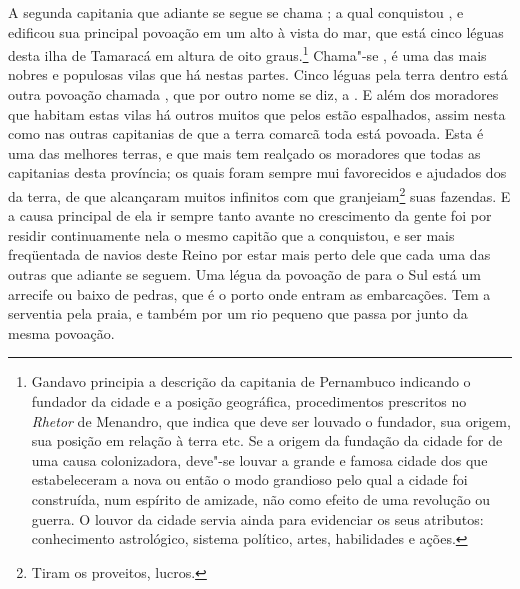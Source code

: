 A segunda capitania que adiante se segue se chama ; a qual
conquistou , e edificou sua principal povoação em um alto
à vista do mar, que está cinco léguas desta ilha de Tamaracá em
altura de oito graus.\footnote{ Gandavo principia a descrição da
capitania de Pernambuco indicando o fundador da cidade e a posição
geográfica, procedimentos prescritos no \textit{Rhetor} de Menandro,
que indica que deve ser louvado o fundador, sua origem, sua posição em
relação à terra etc. Se a origem da fundação da cidade for de uma
causa colonizadora, deve"-se louvar a grande e famosa cidade dos que
estabeleceram a nova ou então o modo grandioso pelo qual a cidade foi
construída, num espírito de amizade, não como efeito de uma revolução
ou guerra. O louvor da cidade servia ainda para evidenciar os seus
atributos: conhecimento astrológico, sistema político, artes,
habilidades e ações.} Chama"-se , é uma das mais nobres e populosas
vilas que há nestas partes. Cinco léguas pela terra dentro está outra
povoação chamada , que por outro nome se diz, a .
E além dos moradores que habitam estas vilas há outros muitos que pelos
 estão espalhados, assim nesta como nas outras
capitanias de que a terra comarcã 
toda está povoada. Esta é uma das
melhores terras, e que mais tem realçado os moradores que todas as
capitanias desta província; os quais foram sempre mui favorecidos e
ajudados dos  da terra, de que alcançaram muitos infinitos
 com que granjeiam\footnote{ Tiram os proveitos, lucros.} suas fazendas. E a causa principal de ela ir
sempre tanto avante no crescimento da gente foi por residir
continuamente nela o mesmo capitão que a conquistou, e ser mais
freqüentada de navios deste Reino por estar mais perto dele que cada uma
das outras que adiante se seguem. Uma légua da povoação de  para
o Sul está um arrecife ou baixo de pedras, que é o porto onde entram as
embarcações. Tem a serventia pela praia, e também por um rio pequeno
que passa por junto da mesma povoação. 

